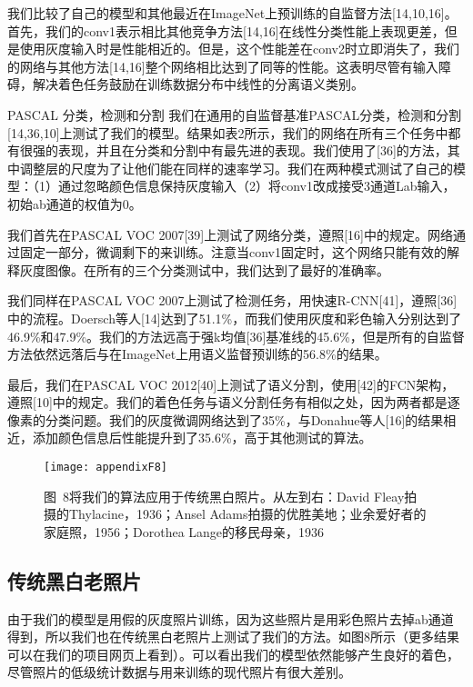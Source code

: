 我们比较了自己的模型和其他最近在ImageNet上预训练的自监督方法[14,10,16]。	首先，我们的conv1表示相比其他竞争方法[14,16]在线性分类性能上表现更差，但是使用灰度输入时是性能相近的。但是，这个性能差在conv2时立即消失了，我们的网络与其他方法[14,16]整个网络相比达到了同等的性能。这表明尽管有输入障碍，解决着色任务鼓励在训练数据分布中线性的分离语义类别。

{\heiti PASCAL 分类，检测和分割 } 我们在通用的自监督基准PASCAL分类，检测和分割[14,36,10]上测试了我们的模型。结果如表2所示，我们的网络在所有三个任务中都有很强的表现，并且在分类和分割中有最先进的表现。我们使用了[36]的方法，其中调整层的尺度为了让他们能在同样的速率学习。我们在两种模式测试了自己的模型：（1）通过忽略颜色信息保持灰度输入（2）将conv1改成接受3通道Lab输入，初始ab通道的权值为0。

我们首先在PASCAL VOC 2007[39]上测试了网络分类，遵照[16]中的规定。网络通过固定一部分，微调剩下的来训练。注意当conv1固定时，这个网络只能有效的解释灰度图像。在所有的三个分类测试中，我们达到了最好的准确率。

我们同样在PASCAL VOC 2007上测试了检测任务，用快速R-CNN[41]，遵照[36]中的流程。Doersch等人[14]达到了51.1\%，而我们使用灰度和彩色输入分别达到了46.9\%和47.9\%。我们的方法远高于强k均值[36]基准线的45.6\%，但是所有的自监督方法依然远落后与在ImageNet上用语义监督预训练的56.8\%的结果。

最后，我们在PASCAL VOC 2012[40]上测试了语义分割，使用[42]的FCN架构，遵照[10]中的规定。我们的着色任务与语义分割任务有相似之处，因为两者都是逐像素的分类问题。我们的灰度微调网络达到了35\%，与Donahue等人[16]的结果相近，添加颜色信息后性能提升到了35.6\%，高于其他测试的算法。

\begin{figure}[h]
  \centering
  \texttt{[image: appendixF8]}
  \caption*{图~8\quad 将我们的算法应用于传统黑白照片。从左到右：David Fleay拍摄的Thylacine，1936；Ansel Adams拍摄的优胜美地；业余爱好者的家庭照，1956；Dorothea Lange的移民母亲，1936}
  \label{tab:badfigure10}
\end{figure}

\subsection{传统黑白老照片}

由于我们的模型是用假的灰度照片训练，因为这些照片是用彩色照片去掉ab通道得到，所以我们也在传统黑白老照片上测试了我们的方法。如图8所示（更多结果可以在我们的项目网页上看到）。可以看出我们的模型依然能够产生良好的着色，尽管照片的低级统计数据与用来训练的现代照片有很大差别。

